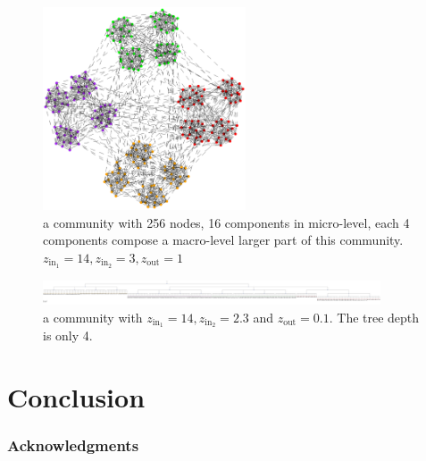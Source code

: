 \documentclass{article}
\begin{document}
\begin{figure}
\centering
\includegraphics[width=6cm]{pic/two_level.eps}
\caption{a community with 256 nodes, 16 components in micro-level, each 4 components compose a macro-level larger part of this community. $z_{\mathrm{in}_1} = 14, z_{\mathrm{in}_2} = 3, z_{\mathrm{out}}=1$}\label{fig:c1}
\end{figure}

\begin{figure}
\centering
\includegraphics[width=10cm]{pic/tree.pdf}
\caption{a community with $z_{\mathrm{in}_1} = 14, z_{\mathrm{in}_2} = 2.3$ and $z_{\mathrm{out}}=0.1$. The tree depth is only 4.}\label{fig:c2}
\end{figure}

\section{Conclusion}\label{sec:conclusion}


\subsubsection*{Acknowledgments}





\end{document}
